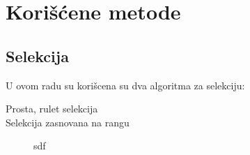 \documentclass[titlepage]{article}
\begin{document}
    \section{Kori\v{s}\'{c}ene metode}
        \subsection{Selekcija}
        U ovom radu su kori\v{s}cena su dva algoritma za selekciju:
        \begin{description}
          \item[Prosta, rulet selekcija] 
          \item[Selekcija zasnovana na rangu] sdf
        \end{description}

	
\end{document}
